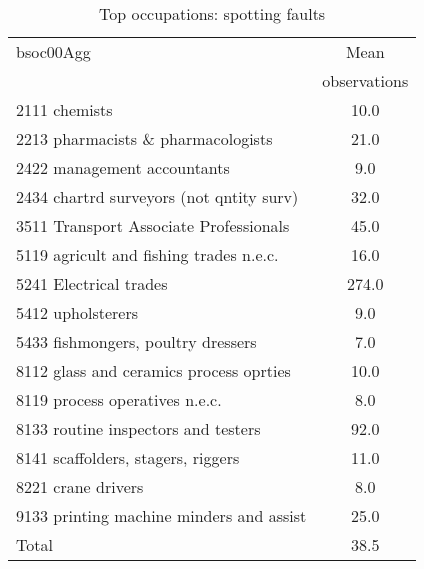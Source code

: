 \begin{table}
	\centering
	\caption{Top occupations: spotting faults}
	\label{tab:topcfaults}
	\begin{tabular}{lc}
	\toprule	
		
bsoc00Agg&Mean \\
&observations \\
\hline
2111 chemists&10.0 \\
2213 pharmacists \& pharmacologists&21.0 \\
2422 management accountants&9.0 \\
2434 chartrd surveyors (not qntity surv)&32.0 \\
3511 Transport Associate Professionals&45.0 \\
5119 agricult and fishing trades n.e.c.&16.0 \\
5241 Electrical trades&274.0 \\
5412 upholsterers&9.0 \\
5433 fishmongers, poultry dressers&7.0 \\
8112 glass and ceramics process oprties&10.0 \\
8119 process operatives n.e.c.&8.0 \\
8133 routine inspectors and testers&92.0 \\
8141 scaffolders, stagers, riggers&11.0 \\
8221 crane drivers&8.0 \\
9133 printing machine minders and assist&25.0 \\
Total&38.5 \\
\bottomrule
\bottomrule
\end{tabular}
\end{table}
